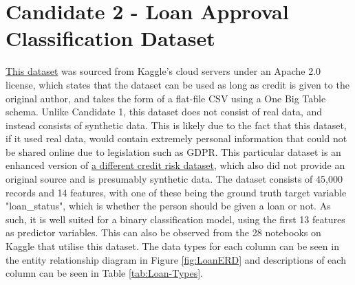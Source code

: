 \documentclass[12pt]{report}
\begin{document}
\section{Candidate 2 - Loan Approval Classification Dataset}
\href{https://www.kaggle.com/datasets/taweilo/loan-approval-classification-data}{This dataset} was sourced from Kaggle's cloud servers under 
an Apache 2.0 license, which states that the dataset can be used as long as credit is given to the original author,
and takes the form of a flat-file CSV using a One Big Table schema. Unlike Candidate 1, this dataset does not consist of real data, and 
instead consists of synthetic data. This is likely due to the fact that this dataset, if it used real data, would contain extremely personal 
information that could not be shared online due to legislation such as GDPR. This particular dataset is an enhanced version of \href{https://www.kaggle.com/datasets/laotse/credit-risk-dataset}{a different credit risk dataset},
which also did not provide an original source and is presumably synthetic data. The dataset consists of 45,000 records and 14 features, with 
one of these being the ground truth target variable "loan\_status", which is whether the person should be given a loan or not. As such, it is well suited 
for a binary classification model, using the first 13 features as predictor variables. This can also be observed from the 28 notebooks on Kaggle that 
utilise this dataset. The data types for each column can be seen in the entity relationship diagram in Figure \ref{fig:LoanERD} and 
descriptions of each column can be seen in Table \ref{tab:Loan-Types}.
\end{document}
